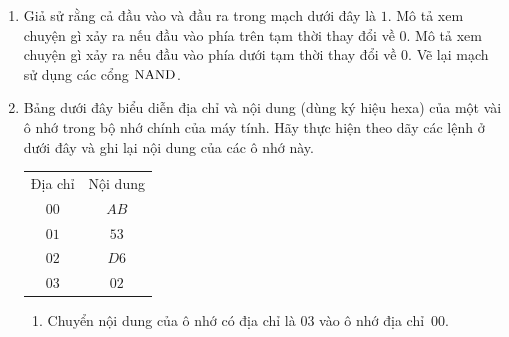 \begin{multicols}{2}
\begin{enumerate}
\begin{enumerate}
    \item {}

    \end{enumerate}

  \item Giả sử rằng cả đầu vào và đầu ra trong mạch dưới đây là $1$. Mô tả xem chuyện gì
    xảy ra nếu đầu vào phía trên tạm thời thay đổi về $0$. Mô tả xem chuyện gì xảy ra nếu
    đầu vào phía dưới tạm thời thay đổi về $0$. Vẽ lại mạch sử dụng các cổng $\operatorname{\mbox{NAND}}$.
    \begin{center}
    \end{center}
  \item Bảng dưới đây biểu diễn địa chỉ và nội dung (dùng ký hiệu hexa) của một vài ô nhớ
    trong bộ nhớ chính của máy tính. Hãy thực hiện theo dãy các lệnh ở dưới đây và ghi lại
    nội dung của các ô nhớ này.

    \begin{tabular}[c]{cc}
      Địa chỉ & Nội dung \\
      $00$ & $AB$ \\
      $01$ & $53$ \\
      $02$ & $D6$ \\
      $03$ & $02$
    \end{tabular}
    \begin{enumerate}[B1. ]
    \item Chuyển nội dung của ô nhớ có địa chỉ là $03$ vào ô nhớ địa chỉ~$00$.


\end{enumerate}
\end{enumerate}
\end{multicols}
